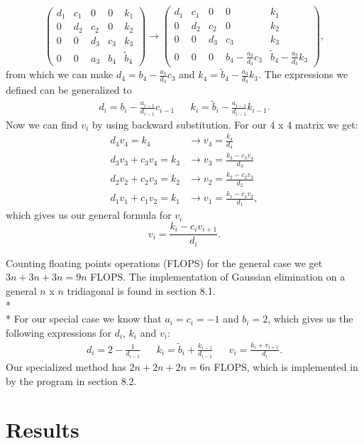 \documentclass[norsk,a4paper,12pt]{article}
\begin{document}
$$\begin{pmatrix}
d_1&c_1&0&0&k_1\\
0&d_2&c_2&0&k_2\\
0&0&d_3&c_3&k_3\\
0&0&a_3&b_4&\tilde{b}_4
\end{pmatrix}\rightarrow \begin{pmatrix}
d_1&c_1&0&0&k_1\\
0&d_2&c_2&0&k_2\\
0&0&d_3&c_3&k_3\\
0&0&0&b_4-\frac{a_3}{d_3}c_3&\tilde{b}_4-\frac{a_3}{d_3}k_3
\end{pmatrix},$$
from which we can make $d_4=b_4-\frac{a_3}{d_3}c_3$ and $k_4 = \tilde{b}_4-\frac{a_3}{d_3}k_3$. The expressions we defined can be generalized to \begin{align*}
d_i=b_i-\frac{a_{i-1}}{d_{i-1}}c_{i-1} && k_i=\tilde{b}_i-\frac{a_{i-1}}{d_{i-1}}k_{i-1}.
\end{align*}
Now we can find $v_i$ by using backward substitution. For our $4$ x $4$ matrix we get:
\begin{align*}
d_4v_4=k_4 &\rightarrow v_4 = \frac{k_4}{d_4} \\
d_3v_3+c_3v_4 = k_3 &\rightarrow v_3=\frac{k_3-c_3v_4}{d_3} \\
d_2v_2+c_2v_3 = k_2 &\rightarrow v_2=\frac{k_2-c_2v_3}{d_2} \\
d_1v_1+c_1v_2 = k_1 &\rightarrow v_1=\frac{k_1-c_1v_2}{d_1},
\end{align*}
which gives us our general formula for $v_i$
$$v_i=\frac{k_i-c_iv_{i+1}}{d_i}.$$

Counting floating points operations (FLOPS) for the general case we get $3n+3n+3n=9n$ FLOPS. The implementation of Gaussian elimination on a general $n$ x $n$ tridiagonal is found in section 8.1. 
\\* \\*
For our special case we know that $a_i=c_i=-1$ and $b_i=2$, which gives us the following expressions for $d_i$, $k_i$ and $v_i$:
\begin{align*}
d_i = 2-\frac{1}{d_{i-1}} && k_i = \tilde{b}_i + \frac{k_{i-1}}{d_{i-1}} && v_i = \frac{k_i+v_{i+1}}{d_i}.
\end{align*}
Our specialized method has $2n+2n+2n=6n$ FLOPS, which is implemented in by the program in section 8.2.

\section{Results}
\end{document}
